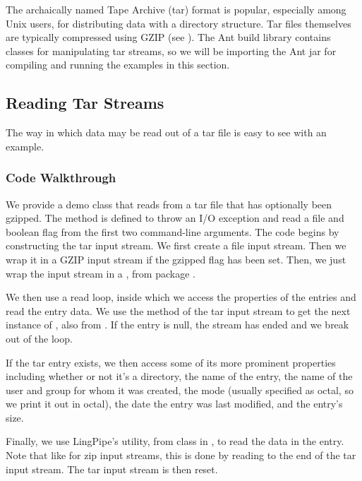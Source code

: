 The archaically named Tape Archive (tar) format is popular, especially
among Unix users, for distributing data with a directory structure.
Tar files themselves are typically compressed using GZIP (see
).  The Ant build library contains classes for
manipulating tar streams, so we will be importing the Ant jar for
compiling and running the examples in this section.

\subsection{Reading Tar Streams}

The way in which data may be read out of a tar file is easy to see
with an example.  

\subsubsection{Code Walkthrough}

We provide a demo class  that
reads from a tar file that has optionally been gzipped.  The 
method is defined to throw an I/O exception and read a file 
and boolean flag  from the first two command-line arguments.
The code begins by constructing the tar input stream.
%
%
We first create a file input stream.  Then we wrap it in a GZIP input
stream if the gzipped flag has been set.  Then, we just wrap the input
stream in a , from package
.

We then use a read loop, inside which we access the properties of
the entries and read the entry data.
%
%
We use the  method of the tar input stream to get
the next instance of , also from
.  If the entry is null, the stream has
ended and we break out of the loop.

If the tar entry exists, we then access some of its more prominent
properties including whether or not it's a directory, the name of
the entry, the name of the user and group for whom it was
created, the mode (usually specified as octal, so we print it out
in octal), the date the entry was last modified, and the entry's size.

Finally, we use LingPipe's  utility, from class
 in , to read the data in the entry.
Note that like for zip input streams, this is done by reading to the
end of the tar input stream.  The tar input stream is then reset. 


